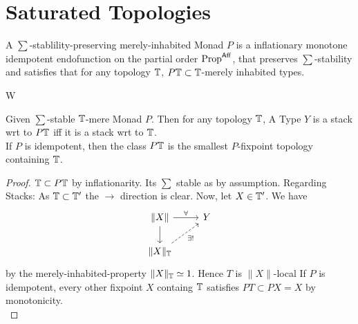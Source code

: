 

\section{Saturated Topologies}
\begin{definition}
	A $\sum$-stablility-preserving merely-inhabited Monad $P$ is a inflationary monotone idempotent endofunction on the  partial order $\operatorname{Prop}^{\mathsf{Aff}}$,  that preserves $\sum$-stability and satisfies that for any topology $\mathbb{T}$, $P \mathbb{T} \subset \mathbb{T}$-merely inhabited types.\\
\end{definition}W
\begin{prop}{\label{prop:TopologyMonad}}
	Given $\sum$-stable $\mathbb{T}$-mere Monad $P$. Then for any topology $\mathbb{T}$, A Type $Y$ is a stack wrt to $P \mathbb{T}$ iff it is a stack wrt to $\mathbb{T}$. \\
	If $P$ is idempotent, then the class $P \mathbb{T}$ is the smallest $P$-fixpoint topology containing $\mathbb{T}$. 
\end{prop}

\begin{proof}
	$\mathbb{T} \subset P \mathbb{T}$ by inflationarity. Its $\sum$ stable as by assumption. 	Regarding Stacks: As $\mathbb{T} \subset \mathbb{T}'$ the $\rightarrow$ direction is clear. Now, let $X \in \mathbb{T}'$. We have
	\[\begin{tikzcd}
		{\|X\|} & Y \\
		{\|X\|_\bT}
		\arrow["\forall", from=1-1, to=1-2]
		\arrow[from=1-1, to=2-1]
		\arrow["{\exists!}"', dashed, from=2-1, to=1-2]
	\end{tikzcd}\]
	by the merely-inhabited-property $\|X\|_{\mathbb{T}}  \simeq 1$. Hence $T$ is $\|X\|$-local	
	If $P$ is idempotent, every other fixpoint $X$ containg $\mathbb{T}$ satisfies $P T \subset P X = X$ by monotonicity. \\
\end{proof}

